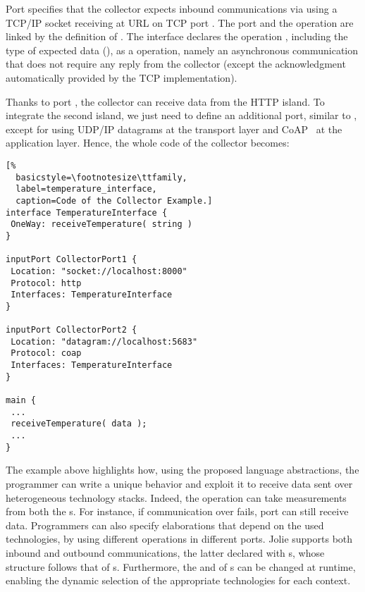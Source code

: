 Port  specifies that the collector expects inbound
communications via   using a TCP/IP socket receiving
at URL  on TCP port . The port and the operation
are linked by the definition of 
. The interface declares the operation
, including the type of expected data
(), as a  operation, namely an asynchronous
communication that does not require any reply from the collector (except the
acknowledgment automatically provided by the TCP implementation).

Thanks to port , the collector can receive data from the
HTTP island. To integrate the second island, we just need to define an
additional port, similar to , except for using UDP/IP
datagrams at the transport layer and CoAP~\cite{doi:10.17487/RFC7252,coap} at the application layer. Hence, the
whole code of the collector becomes:
%
\begin{lstlisting}[%
  basicstyle=\footnotesize\ttfamily,
  label=temperature_interface,
  caption=Code of the Collector Example.]
interface TemperatureInterface {
 OneWay: receiveTemperature( string )
}

inputPort CollectorPort1 {
 Location: "socket://localhost:8000"
 Protocol: http
 Interfaces: TemperatureInterface
}

inputPort CollectorPort2 {
 Location: "datagram://localhost:5683"
 Protocol: coap
 Interfaces: TemperatureInterface
}

main {
 ...
 receiveTemperature( data );
 ...
}
\end{lstlisting}
%
The example above highlights how, using the proposed language abstractions, the
programmer can write a unique behavior and exploit it to receive data sent over
heterogeneous technology stacks. Indeed, the 
operation can take measurements from both the s.
%
For instance, if communication over  fails, port
 can still receive data.
%
Programmers can also specify elaborations that depend on the used technologies,
by using different operations in different ports.
Jolie supports both inbound and outbound
communications, the latter declared with s, whose structure
follows that of s. Furthermore, the  and
 of s can be changed at runtime, enabling the
dynamic selection of the appropriate technologies for each context.

